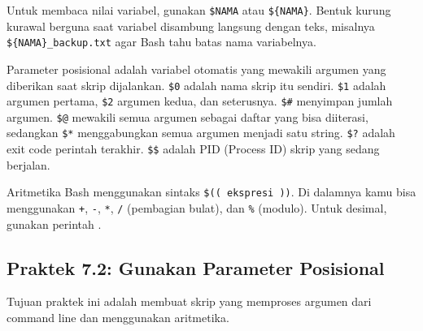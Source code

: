 Untuk membaca nilai variabel, gunakan \texttt{\$NAMA} atau
\texttt{\$\{NAMA\}}. Bentuk kurung kurawal berguna saat variabel disambung
langsung dengan teks, misalnya \texttt{\$\{NAMA\}\_backup.txt} agar Bash
tahu batas nama variabelnya.

Parameter posisional adalah variabel otomatis yang mewakili argumen
yang diberikan saat skrip dijalankan. \texttt{\$0} adalah nama skrip
itu sendiri. \texttt{\$1} adalah argumen pertama, \texttt{\$2} argumen
kedua, dan seterusnya. \texttt{\$\#} menyimpan jumlah argumen.
\texttt{\$@} mewakili semua argumen sebagai daftar yang bisa diiterasi,
sedangkan \texttt{\$*} menggabungkan semua argumen menjadi satu string.
\texttt{\$?} adalah exit code perintah terakhir. \texttt{\$\$} adalah
PID (Process ID) skrip yang sedang berjalan.

Aritmetika Bash menggunakan sintaks \texttt{\$(( ekspresi ))}. Di
dalamnya kamu bisa menggunakan \texttt{+}, \texttt{-}, \texttt{*},
\texttt{/} (pembagian bulat), dan \texttt{\%} (modulo). Untuk desimal,
gunakan perintah .

\subsection*{Praktek 7.2: Gunakan Parameter Posisional}

Tujuan praktek ini adalah membuat skrip yang memproses argumen dari
command line dan menggunakan aritmetika.


